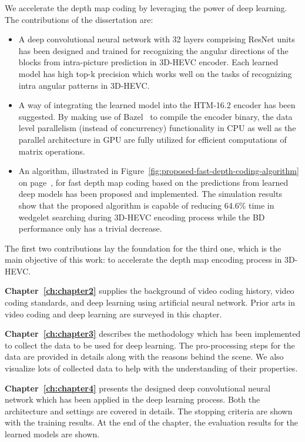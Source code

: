 We accelerate the depth map coding by leveraging the power of
deep learning.
The contributions of the dissertation are:
\begin{itemize}
  \item A deep convolutional neural network with 32 layers comprising ResNet
  units~\parencite{RN67} has been designed and trained for recognizing the
  angular directions of the blocks from intra-picture prediction in 3D-HEVC
  encoder.
  Each learned model has high top-k precision which works well on the
  tasks of recognizing intra angular patterns in 3D-HEVC\@.
  \item A way of integrating the learned model into the HTM-16.2 encoder has
  been suggested.
  By making use of Bazel~\parencite{RN200} to compile the encoder binary, the
  data level parallelism (instead of concurrency) functionality in CPU
  as well as the parallel architecture in GPU are fully utilized for
  efficient computations of matrix operations.
  \item An algorithm, illustrated in
  Figure~\ref{fig:proposed-fast-depth-coding-algorithm}
  on page~\pageref{fig:proposed-fast-depth-coding-algorithm}, for fast
  depth map coding based
  on the predictions from
  learned deep models has been proposed and implemented.
  The simulation results show that the proposed algorithm is capable of
  reducing 64.6\% time in wedgelet searching during 3D-HEVC encoding process
  while the BD performance only has a trivial decrease.
\end{itemize}
The first two contributions lay the foundation for the third one, which is the
main objective of this work: to accelerate the depth map encoding process in
3D-HEVC\@.

\textbf{Chapter~\ref{ch:chapter2}} supplies the background of video
coding history, video coding standards, and deep learning using artificial
neural network.
Prior arts in video coding and deep learning are surveyed in this chapter.

\textbf{Chapter~\ref{ch:chapter3}} describes the methodology which has been
implemented to collect the data to be used for deep learning.
The pro-processing steps for the data are provided in details along with
the reasons behind the scene.
We also visualize lots of collected data to help with the understanding of
their properties.

\textbf{Chapter~\ref{ch:chapter4}} presents the designed deep convolutional
neural network which has been applied in the deep learning process.
Both the architecture and settings
are covered in details.
The stopping criteria are shown with the training results.
At the end of the chapter, the evaluation results for the learned models
are shown.

